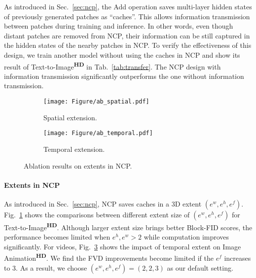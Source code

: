 \documentclass{article}
\begin{document}
As introduced in Sec.~\ref{sec:ncp}, the Add operation saves multi-layer hidden states of previously generated patches as ``caches''. 
This allows information transmission between patches during training and inference. In other words, even though distant patches are removed from NCP, their information can be still captured in the hidden states of the nearby patches in NCP. 
To verify the effectiveness of this design, we train another model without using the caches in NCP and show its result of Text-to-Image\textsuperscript{\textbf{HD}} in Tab.~\ref{tab:transfer}.
The NCP design with information transmission significantly outperforms the one without information transmission.




\begin{figure}
\centering
\begin{subfigure}[t]{0.44\textwidth}
    \centering
    \texttt{[image: Figure/ab\_spatial.pdf]}
\caption{Spatial extension.}
    \label{fig:spatialextend}
\end{subfigure}
\begin{subfigure}[t]{0.44\textwidth}
    \centering
    \texttt{[image: Figure/ab\_temporal.pdf]}
\caption{Temporal extension.}
    \label{fig:temporalextend}
\end{subfigure}
\vspace{1.5em}
\caption{Ablation results on extents in NCP.}

\vspace{-2em}
\end{figure}








\paragraph{Extents in NCP}
As introduced in Sec.~\ref{sec:ncp}, NCP saves caches in a 3D extent $(e^w, e^h, e^f)$. Fig.~\ref{fig:spatialextend} shows the comparisons between different extent size of $(e^w, e^h, e^f)$ for Text-to-Image\textsuperscript{\textbf{HD}}. Although larger extent size brings better Block-FID scores, the performance becomes limited when $e^{h},e^{w}>2$ while computation improves significantly. For videos, Fig.~\ref{fig:temporalextend} shows the impact of temporal extent on Image Animation\textsuperscript{\textbf{HD}}. We find the FVD improvements become limited if the $e^f$ increases to 3. As a result, we choose $(e^w, e^h, e^f)=(2,2,3)$ as our default setting. 
\end{document}
